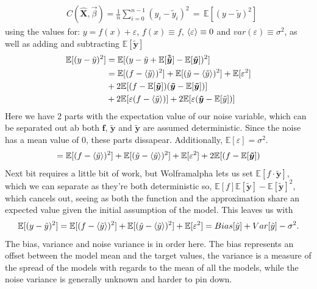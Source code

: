\documentclass[12pt]{revtex4-2}
\begin{document}
\begin{align}
    & C(\mathbf{\hat{X}}, \vec{\beta}) 
		 = \frac{1}{n} \sum_{i=0}^{n-1}(y_i - \tilde{y}_i)^2
		 \,=\, \mathbb{E}[(y- \tilde{y})^2]
\end{align}
using the values for: $y = f(x) + \varepsilon$, $f(x) \equiv f$, 
$\ev{\varepsilon} \equiv 0$ and $var(\varepsilon)\equiv \sigma^2$, as well as adding and
subtracting $\mathbb{E}[\bm{\tilde{y}}]$
\begin{align}
	\mathbb{E}[(y- \tilde{y})^2] 
	&	= \mathbb{E}[(y - \tilde{y} + \mathbb{E}[\bm{\tilde{\tilde{y}}}] 
		- \mathbb{E}[\bm{\tilde{y}}])^2] \nonumber \\
	&= \mathbb{E}[(f-\ev{\tilde{y}})^2] 
	+ \mathbb{E}[(\tilde{y} - \ev{\tilde{y}})^2] 
	+ \mathbb{E}[\varepsilon^2] \nonumber\\
	&+ 2\mathbb{E}[(f-\mathbb{E}[\bm{\tilde{y}}])(\bm{\tilde{y}} 
		- \mathbb{E}[\bm{\tilde{y}}])] \nonumber\\
	&+ 2\mathbb{E}[\varepsilon(f-\ev{\tilde{y}})] 
	+ 2\mathbb{E}[\varepsilon(\bm{\tilde{y}} - \mathbb{E}[\tilde{y}])]
\end{align}
Here we have 2 parts with the expectation value of our noise variable, which can be 
separated out ab both $\bm{f}$, $\bm{\tilde{y}}$ and $\bm{\tilde{y}}$ are assumed
deterministic. Since the noise has a mean value of $0$, these parts dissapear. 
Additionally, $\mathbb{E}[\varepsilon]=\sigma^2$.
\begin{align}
	= \mathbb{E}[(f-\ev{\tilde{y}})^2] 
	+ \mathbb{E}[(\tilde{y} - \ev{\tilde{y}})^2] 
	+ \mathbb{E}[\varepsilon^2]
	+ 2\mathbb{E}[(f-\mathbb{E}[\bm{\tilde{y}}])
\end{align}
Next bit requires a little bit of work, but 
Wolframalpha\cite{wolframalpha2020expval} lets us set 
$\mathbb{E}[f\cdot\bm{\tilde{y}}]$, which we can separate as they're both deterministic
so, $ \mathbb{E}[f]\mathbb{E}[\bm{\tilde{y}}] - \mathbb{E}[\bm{\tilde{y}}]^2 $, which
cancels out, seeing as both the function and the approximation share an expected value
given the initial assumption of the model. This leaves us with 
\begin{align}
	\mathbb{E}[(y- \tilde{y})^2] 
	= \mathbb{E}[(f-\ev{\tilde{y}})^2] 
	+ \mathbb{E}[(\tilde{y} - \ev{\tilde{y}})^2] 
	+ \mathbb{E}[\varepsilon^2]
     = Bias[\tilde{y}] + Var[\tilde{y}] - \sigma^2.
\end{align}
The bias, variance and noise variance is in order here. The bias represents an offset
between the model mean and the target values, the variance is a measure of the spread of
the models with regards to the mean of all the models, while the noise variance is 
generally unknown and harder to pin down. 
\end{document}
